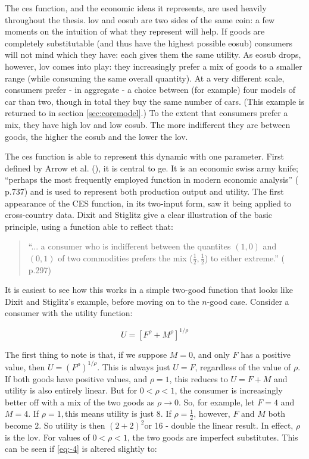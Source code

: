 The \gls{ces} function, and the economic ideas it represents, are used heavily throughout the thesis. \Gls{lov} and \gls{eosub} are two sides of the same coin: a few moments on the intuition of what they represent will help. If goods are completely substitutable (and thus have the highest possible \gls{eosub}) consumers will not mind which they have: each gives them the same utility. As \gls{eosub} drops, however, \gls{lov} comes into play: they increasingly prefer a mix of goods to a smaller range (while consuming the same overall quantity). At a very different scale, consumers prefer - in aggregate - a choice between (for example) four models of car than two, though in total they buy the same number of cars. (This example is returned to in section \ref{sec:coremodel}.) To the extent that consumers prefer a mix, they have high \gls{lov} and low \gls{eosub}. The more indifferent they are between goods, the higher the \gls{eosub} and the lower the \gls{lov}.

The \gls{ces} function is able to represent this dynamic with one parameter. First defined by Arrow et al. (\citealt{arrow_capital-labor_1961}), it is central to \gls{ge}. It is an economic swiss army knife; ``perhaps the most frequently employed function in modern economic analysis'' (\citealt{durlauf_new_2008} p.737) and is used to represent both production output and utility. The first appearance of the CES function, in its two-input form, saw it being applied to cross-country data. Dixit and Stiglitz give a clear illustration of the basic principle, using a function able to reflect that:

\begin{quote}
``... a consumer who is indifferent between the quantites $(1,0)$ and $(0,1)$ of two commodities prefers the mix ($\frac{1}{2},\frac{1}{2}$) to either extreme.'' (\citealt{dixit_monopolistic_1977} p.297)
\end{quote}

It is easiest to see how this works in a simple two-good function that looks like Dixit and Stiglitz's example, before moving on to the $n$-good case. Consider a consumer with the utility function: 

\begin{equation}
U=\left[F^{\rho}+M^{\rho}\right]^{1/\rho}\label{eq:-4}
\end{equation}

The first thing to note is that, if we suppose $M=0$, and only $F$ has a positive value, then $U=(F^{\rho})^{1/\rho}$. This is always just $U=F$, regardless of the value of $\rho$. If both goods have positive values, and $\rho=1$, this reduces to $U=F+M$ and utility is also entirely linear. But for $0<\rho<1$, the consumer is increasingly better off with a mix of the two goods as $\rho\rightarrow0$. So, for example, let $F=4$ and $M=4$. If $\rho=1,$this means utility is just 8. If $\rho=\frac{1}{2}$, however, $F$ and $M$ both become $2$. So utility is then $(2+2)^{2}$or 16 - double the linear result. In effect, $\rho$ is the \gls{lov}. For values of $0<\rho<1$, the two goods are imperfect substitutes. This can be seen if \eqref{eq:-4} is altered slightly to:

